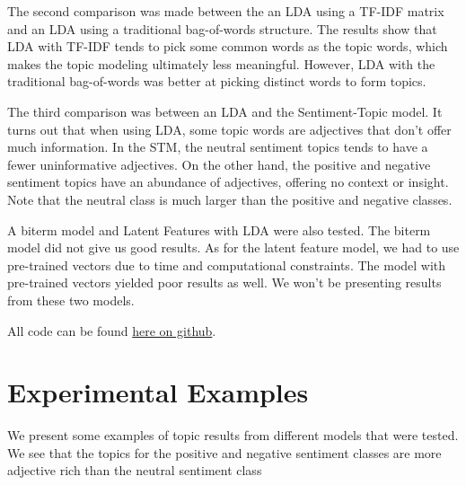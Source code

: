 \documentclass[12pt]{amsart}
\newcommand{\0}{\mat{0}}
\newcommand{\1}{\mathds{1}}
\begin{document}
The second comparison was made between the an LDA using a TF-IDF matrix and an LDA using a traditional bag-of-words structure. The results show that LDA with TF-IDF tends to pick some common words as the topic words, which makes the topic modeling ultimately less meaningful. However, LDA with the traditional bag-of-words was better at picking distinct words to form topics.

The third comparison was between an LDA and the Sentiment-Topic model. It turns out that when using LDA, some topic words are adjectives that don't offer much information. In the STM, the neutral sentiment topics tends to have a fewer uninformative adjectives. On the other hand, the positive and negative sentiment topics have an abundance of adjectives, offering no context or insight. Note that the neutral class is much larger than the positive and negative classes. 

A biterm model and Latent Features with LDA were also tested. The biterm model did not give us good results. As for the latent feature model, we had to use pre-trained vectors due to time and computational constraints. The model with pre-trained vectors yielded poor results as well. We won't be presenting results from these two models.

All code can be found \href{https://github.com/woollysocks/twitterShenanigans/tree/master/scripts}{here on github}.

\section{Experimental Examples}
We present some examples of topic results from different models that were tested. We see that the topics for the positive and negative sentiment classes are more adjective rich than the neutral sentiment class \bigskip 
\end{document}

